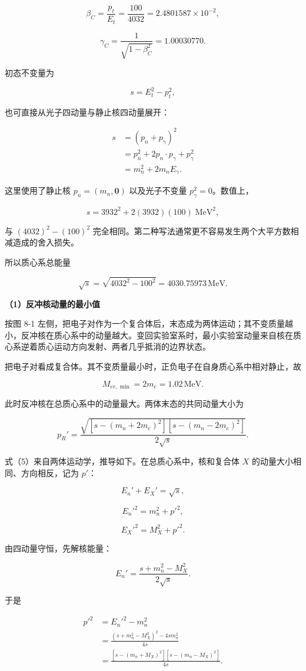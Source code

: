 \documentclass[12pt,a4paper,UTF8]{ctexart}
\begin{document}
\[\boxed{
\beta_C=\frac{p_t}{E_t}
=\frac{100}{4032}
=2.4801587\times10^{-2}
},\]

\[\gamma_C=\frac1{\sqrt{1-\beta_C^2}}
=1.00030770. \tag{2}\]

初态不变量为

\[s=E_t^2-p_t^2,\]

也可直接从光子四动量与静止核四动量展开：

\[\begin{aligned}
s
&=(p_n+p_\gamma)^2\\
&=p_n^2+2p_n\cdot p_\gamma+p_\gamma^2\\
&=m_n^2+2m_nE_\gamma.
\end{aligned}\]

这里使用了静止核 \(p_n=(m_n,\boldsymbol0)\) 以及光子不变量
\(p_\gamma^2=0\)。数值上，

\[s=3932^2+2(3932)(100)\;\mathrm{MeV}^2,\]

与 \((4032)^2-(100)^2\)
完全相同。第二种写法通常更不容易发生两个大平方数相减造成的舍入损失。

所以质心系总能量

\[\sqrt s=\sqrt{4032^2-100^2}
=4030.75973\,\mathrm{MeV}. \tag{3}\]

\textbf{（1）反冲核动量的最小值}

按图 8-1
左侧，把电子对作为一个复合体后，末态成为两体运动；其不变质量越小，反冲核在质心系中的动量越大。变回实验室系时，最小实验室动量来自核在质心系逆着质心运动方向发射、两者几乎抵消的边界状态。

把电子对看成复合体。其不变质量最小时，正负电子在自身质心系中相对静止，故

\[M_{ee,\min}=2m_e=1.02\,\mathrm{MeV}. \tag{4}\]

此时反冲核在总质心系中的动量最大。两体末态的共同动量大小为

\[\boxed{
p_R'=\frac{
\sqrt{[s-(m_n+2m_e)^2][s-(m_n-2m_e)^2]}
}{2\sqrt s}
}. \tag{5}\]

式（5）来自两体运动学，推导如下。在总质心系中，核和复合体 \(X\)
的动量大小相同、方向相反，记为 \(p'\)：

\[E_n' + E_X'=\sqrt s,\]

\[E_n'^2=m_n^2+p'^2,\]

\[E_X'^2=M_X^2+p'^2.\]

由四动量守恒，先解核能量：

\[E_n'=\frac{s+m_n^2-M_X^2}{2\sqrt s}.\]

于是

\[\begin{aligned}
p'^2
&=E_n'^2-m_n^2\\
&=\frac{(s+m_n^2-M_X^2)^2-4sm_n^2}{4s}\\
&=\frac{[s-(m_n+M_X)^2][s-(m_n-M_X)^2]}{4s}.
\end{aligned}\]
\end{document}
